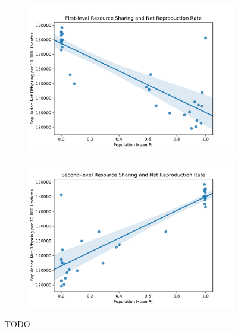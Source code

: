 \begin{figure}[t]
\begin{center}

\begin{subfigure}[b]{\columnwidth}
  \includegraphics[width=\columnwidth]{img/mean_res_pool1_vs_net_reproduction}
  \label{fig:mean_res_pool1_vs_net_reproduction}
\end{subfigure}

\begin{subfigure}[b]{\columnwidth}
  \includegraphics[width=\columnwidth]{img/mean_res_pool2_vs_net_reproduction}
  \label{fig:mean_res_pool2_vs_net_reproduction}
\end{subfigure}

\caption{
TODO
}
\label{fig:net_reproduction}
\end{center}
\end{figure}
